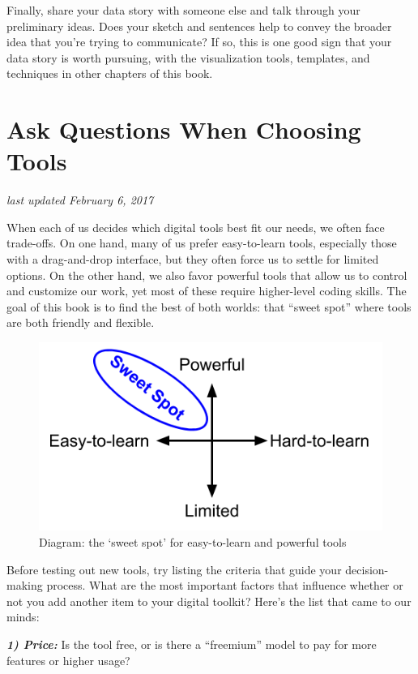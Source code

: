 \documentclass[
  english,
]{book}
\begin{document}
Finally, share your data story with someone else and talk through your preliminary ideas. Does your sketch and sentences help to convey the broader idea that you're trying to communicate? If so, this is one good sign that your data story is worth pursuing, with the visualization tools, templates, and techniques in other chapters of this book.

\hypertarget{ask}{%
\section{Ask Questions When Choosing Tools}\label{ask}}

\emph{last updated February 6, 2017}

When each of us decides which digital tools best fit our needs, we often face trade-offs. On one hand, many of us prefer easy-to-learn tools, especially those with a drag-and-drop interface, but they often force us to settle for limited options. On the other hand, we also favor powerful tools that allow us to control and customize our work, yet most of these require higher-level coding skills. The goal of this book is to find the best of both worlds: that ``sweet spot'' where tools are both friendly and flexible.

\begin{figure}
\centering
\includegraphics{images/01-choose/tool-sweet-spot.png}
\caption{Diagram: the `sweet spot' for easy-to-learn and powerful tools}
\end{figure}

Before testing out new tools, try listing the criteria that guide your decision-making process. What are the most important factors that influence whether or not you add another item to your digital toolkit? Here's the list that came to our minds:

\textbf{\emph{1) Price:}} Is the tool free, or is there a ``freemium'' model to pay for more features or higher usage?
\end{document}
